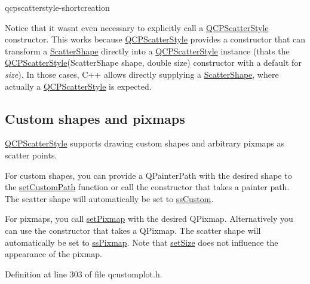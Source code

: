 \begin{DoxyCodeInclude}
\end{DoxyCodeInclude}
qcpscatterstyle-\/shortcreation

Notice that it wasn\textquotesingle{}t even necessary to explicitly call a \hyperlink{class_q_c_p_scatter_style}{Q\+C\+P\+Scatter\+Style} constructor. This works because \hyperlink{class_q_c_p_scatter_style}{Q\+C\+P\+Scatter\+Style} provides a constructor that can transform a \hyperlink{class_q_c_p_scatter_style_adb31525af6b680e6f1b7472e43859349}{Scatter\+Shape} directly into a \hyperlink{class_q_c_p_scatter_style}{Q\+C\+P\+Scatter\+Style} instance (that\textquotesingle{}s the \hyperlink{class_q_c_p_scatter_style}{Q\+C\+P\+Scatter\+Style}(Scatter\+Shape shape, double size) constructor with a default for {\itshape size}). In those cases, C++ allows directly supplying a \hyperlink{class_q_c_p_scatter_style_adb31525af6b680e6f1b7472e43859349}{Scatter\+Shape}, where actually a \hyperlink{class_q_c_p_scatter_style}{Q\+C\+P\+Scatter\+Style} is expected.\hypertarget{class_q_c_p_scatter_style_QCPScatterStyle-custompath-and-pixmap}{}\subsection{Custom shapes and pixmaps}\label{class_q_c_p_scatter_style_QCPScatterStyle-custompath-and-pixmap}
\hyperlink{class_q_c_p_scatter_style}{Q\+C\+P\+Scatter\+Style} supports drawing custom shapes and arbitrary pixmaps as scatter points.

For custom shapes, you can provide a Q\+Painter\+Path with the desired shape to the \hyperlink{class_q_c_p_scatter_style_a96a3e949f90b2afe5677ca9412a12a1e}{set\+Custom\+Path} function or call the constructor that takes a painter path. The scatter shape will automatically be set to \hyperlink{class_q_c_p_scatter_style_adb31525af6b680e6f1b7472e43859349a15d9bcfd9de94edda949006529f9219d}{ss\+Custom}.

For pixmaps, you call \hyperlink{class_q_c_p_scatter_style_a5fb611d46acfac520d7b89a1c71d9246}{set\+Pixmap} with the desired Q\+Pixmap. Alternatively you can use the constructor that takes a Q\+Pixmap. The scatter shape will automatically be set to \hyperlink{class_q_c_p_scatter_style_adb31525af6b680e6f1b7472e43859349a8718b849ca7c307b07b8e091efb0c31e}{ss\+Pixmap}. Note that \hyperlink{class_q_c_p_scatter_style_aaefdd031052892c4136129db68596e0f}{set\+Size} does not influence the appearance of the pixmap. 

Definition at line 303 of file qcustomplot.\+h.



